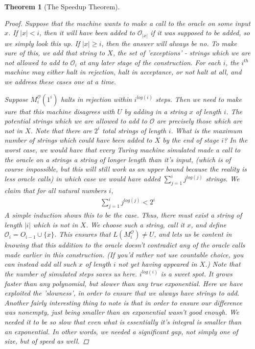 \documentclass{article}
\theoremstyle{definition}
\theoremstyle{plain}
\theoremstyle{theorem}
\newtheorem{theorem}{Theorem}[section]
\begin{document}
\begin{theorem}[The Speedup Theorem]
\begin{proof}
    \par Suppose that the machine wants to make a call to the oracle on some input $x$. If $|x|<i$, then it will have been added to $\mathcal{O}_{|x|}$ if it was supposed to be added, so we simply look this up. If $|x|\geq i$, then the answer will \textit{always} be no. To make sure of this, we add that string to $X$, the set of 'exceptions' - strings which we are not allowed to add to $\mathcal{O}_i$ at any later stage of the construction. For each $i$, the $i^{th}$ machine may either halt in rejection, halt in acceptance, or not halt at all, and we address these cases one at a time.
    \par Suppose $M_i^{\mathcal{O}}(1^i)$ halts in rejection within $i^{log(i)}$ steps. Then we need to make sure that this machine disagrees with $U$ by adding in a string $x$ of length $i$. The potential strings which we are allowed to add to $\mathcal{O}$ are precisely those which are not in $X$. Note that there are $2^i$ total strings of length $i$. What is the maximum number of strings which could have been added to $X$ by the end of stage $i$? In the worst case, we would have that every Turing machine simulated made a call to the oracle on a strings a string of longer length than it's input, (which is of course impossible, but this will still work as an upper bound because the reality is less oracle calls) in which case we would have added $\sum_{j=1}^{i}j^{log(j)}$ strings. We claim that for all natural numbers $i$,
    \begin{align}
        \sum_{j=1}^{i}j^{log(j)} < 2^i
    \end{align}
    A simple induction shows this to be the case. Thus, there must exist a string of length $|i|$ which is not in $X$. We choose such a string, call it $x$, and define $\mathcal{O}_i = O_{i-1} \cup \{x\}$. This ensures that $L(M_i^{\mathcal{O}}) \neq U$, and lets us be content in knowing that this addition to the oracle doesn't contradict any of the oracle calls made earlier in this construction. (If you'd rather not use countable choice, you can instead add all such $x$ of length $i$ not yet having appeared in $X$.) Note that the number of simulated steps saves us here. $i^{log(i)}$ is a sweet spot. It grows faster than any polynomial, but slower than any true exponential. Here we have exploited the 'slowness', in order to ensure that we always have strings to add. Another fairly interesting thing to note is that in order to ensure our difference was nonempty, just being smaller than an exponential wasn't good enough. We needed it to be so slow that \textit{even what is essentially it's integral} is smaller than an exponential. In other words, we needed a significant gap, not simply one of size, but of speed as well.

\end{proof}
\end{theorem}
\end{document}
